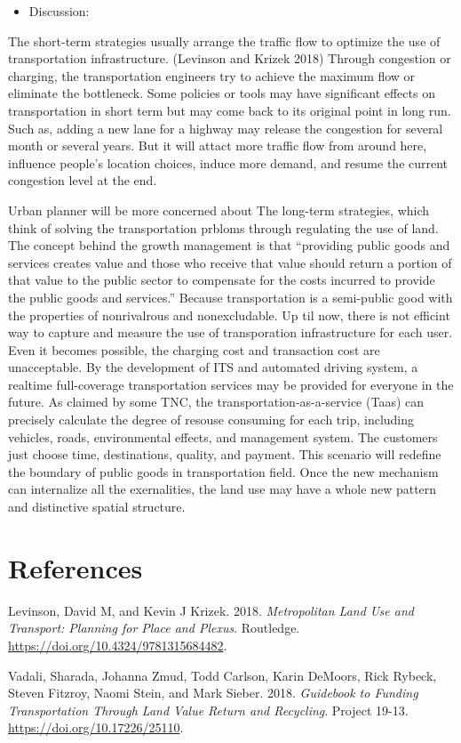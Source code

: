 \documentclass[12pt,]{article}
\providecommand{\tightlist}{%
  \setlength{\itemsep}{0pt}\setlength{\parskip}{0pt}}
\begin{document}
\begin{itemize}
\tightlist
\item
  Discussion:
\end{itemize}

The short-term strategies usually arrange the traffic flow to optimize
the use of transportation infrastructure. (Levinson and Krizek 2018)
Through congestion or charging, the transportation engineers try to
achieve the maximum flow or eliminate the bottleneck. Some policies or
tools may have significant effects on transportation in short term but
may come back to its original point in long run. Such as, adding a new
lane for a highway may release the congestion for several month or
several years. But it will attact more traffic flow from around here,
influence people's location choices, induce more demand, and resume the
current congestion level at the end.

Urban planner will be more concerned about The long-term strategies,
which think of solving the transportation prbloms through regulating the
use of land. The concept behind the growth management is that
``providing public goods and services creates value and those who
receive that value should return a portion of that value to the public
sector to compensate for the costs incurred to provide the public goods
and services.'' Because transportation is a semi-public good with the
properties of nonrivalrous and nonexcludable. Up til now, there is not
efficint way to capture and measure the use of transporation
infrastructure for each user. Even it becomes possible, the charging
cost and transaction cost are unacceptable. By the development of ITS
and automated driving system, a realtime full-coverage transportation
services may be provided for everyone in the future. As claimed by some
TNC, the transportation-as-a-service (Taas) can precisely calculate the
degree of resouse consuming for each trip, including vehicles, roads,
environmental effects, and management system. The customers just choose
time, destinations, quality, and payment. This scenario will redefine
the boundary of public goods in transportation field. Once the new
mechanism can internalize all the exernalities, the land use may have a
whole new pattern and distinctive spatial structure.

\hypertarget{references}{%
\section*{References}\label{references}}

\hypertarget{refs}{}
\leavevmode\hypertarget{ref-levinson2018metropolitan}{}%
Levinson, David M, and Kevin J Krizek. 2018. \emph{Metropolitan Land Use
and Transport: Planning for Place and Plexus}. Routledge.
\url{https://doi.org/10.4324/9781315684482}.

\leavevmode\hypertarget{ref-vadali2018guidebook}{}%
Vadali, Sharada, Johanna Zmud, Todd Carlson, Karin DeMoors, Rick Rybeck,
Steven Fitzroy, Naomi Stein, and Mark Sieber. 2018. \emph{Guidebook to
Funding Transportation Through Land Value Return and Recycling}. Project
19-13. \url{https://doi.org/10.17226/25110}.
\end{document}

